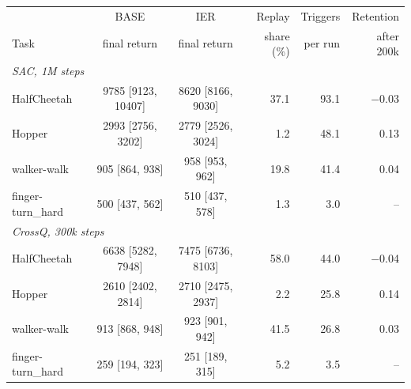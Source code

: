 \begin{tabular}{lccrrr}
\toprule
 & BASE & IER & Replay & Triggers & Retention \\
Task & final return & final return & share (\%) & per run & after 200k \\
\midrule
\multicolumn{6}{l}{\textit{SAC, 1M steps}} \\
HalfCheetah & 9785 [9123, 10407] & 8620 [8166, 9030] & 37.1 & 93.1 & $-$0.03 \\
Hopper & 2993 [2756, 3202] & 2779 [2526, 3024] & 1.2 & 48.1 & 0.13 \\
walker-walk & 905 [864, 938] & 958 [953, 962] & 19.8 & 41.4 & 0.04 \\
finger-turn\_hard & 500 [437, 562] & 510 [437, 578] & 1.3 & 3.0 & -- \\
\midrule
\multicolumn{6}{l}{\textit{CrossQ, 300k steps}} \\
HalfCheetah & 6638 [5282, 7948] & 7475 [6736, 8103] & 58.0 & 44.0 & $-$0.04 \\
Hopper & 2610 [2402, 2814] & 2710 [2475, 2937] & 2.2 & 25.8 & 0.14 \\
walker-walk & 913 [868, 948] & 923 [901, 942] & 41.5 & 26.8 & 0.03 \\
finger-turn\_hard & 259 [194, 323] & 251 [189, 315] & 5.2 & 3.5 & -- \\
\bottomrule
\end{tabular}
